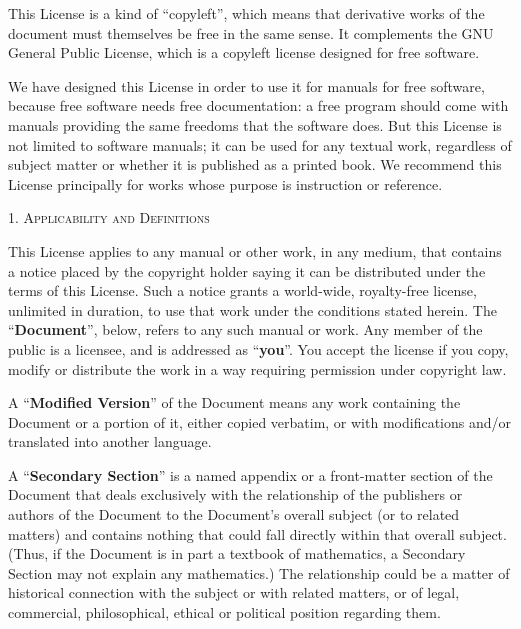 \documentclass{article}
\begin{document}
This License is a kind of ``copyleft'', which means that derivative
works of the document must themselves be free in the same sense.  It
complements the GNU General Public License, which is a copyleft
license designed for free software.

We have designed this License in order to use it for manuals for free
software, because free software needs free documentation: a free
program should come with manuals providing the same freedoms that the
software does.  But this License is not limited to software manuals;
it can be used for any textual work, regardless of subject matter or
whether it is published as a printed book.  We recommend this License
principally for works whose purpose is instruction or reference.

\newcommand{\licenseSection}[1]{%
\begin{center}
\medskip
	{\Large
		\textsc{#1}
	}
\end{center}
}

\licenseSection{1. Applicability and Definitions}

This License applies to any manual or other work, in any medium, that
contains a notice placed by the copyright holder saying it can be
distributed under the terms of this License.  Such a notice grants a
world-wide, royalty-free license, unlimited in duration, to use that
work under the conditions stated herein.  The ``\textbf{Document}'', below,
refers to any such manual or work.  Any member of the public is a
licensee, and is addressed as ``\textbf{you}''.  You accept the license if you
copy, modify or distribute the work in a way requiring permission
under copyright law.

A ``\textbf{Modified Version}'' of the Document means any work containing the
Document or a portion of it, either copied verbatim, or with
modifications and/or translated into another language.

A ``\textbf{Secondary Section}'' is a named appendix or a front-matter section of
the Document that deals exclusively with the relationship of the
publishers or authors of the Document to the Document's overall subject
(or to related matters) and contains nothing that could fall directly
within that overall subject.  (Thus, if the Document is in part a
textbook of mathematics, a Secondary Section may not explain any
mathematics.)  The relationship could be a matter of historical
connection with the subject or with related matters, or of legal,
commercial, philosophical, ethical or political position regarding
them.
\end{document}
